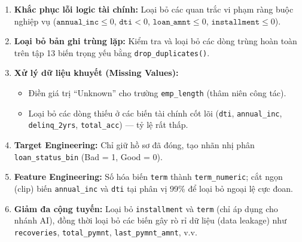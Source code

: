 \begin{enumerate}
    \item \textbf{Khắc phục lỗi logic tài chính:} Loại bỏ các quan trắc vi phạm ràng buộc nghiệp vụ ($\texttt{annual\_inc} \le 0$, $\texttt{dti} < 0$, $\texttt{loan\_amnt} \le 0$, $\texttt{installment} \le 0$).
    \item \textbf{Loại bỏ bản ghi trùng lặp:} Kiểm tra và loại bỏ các dòng trùng hoàn toàn trên tập 13 biến trọng yếu bằng \texttt{drop\_duplicates()}.
    \item \textbf{Xử lý dữ liệu khuyết (Missing Values):}
    \begin{itemize}
        \item Điền giá trị ``Unknown'' cho trường \texttt{emp\_length} (thâm niên công tác).
        \item Loại bỏ các dòng thiếu ở các biến tài chính cốt lõi (\texttt{dti}, \texttt{annual\_inc}, \texttt{delinq\_2yrs}, \texttt{total\_acc}) — tỷ lệ rất thấp.
    \end{itemize}
    \item \textbf{Target Engineering:} Chỉ giữ hồ sơ đã đóng, tạo nhãn nhị phân \texttt{loan\_status\_bin} (Bad = 1, Good = 0).
    \item \textbf{Feature Engineering:} Số hóa biến \texttt{term} thành \texttt{term\_numeric}; cắt ngọn (clip) biến \texttt{annual\_inc} và \texttt{dti} tại phân vị 99\% để loại bỏ ngoại lệ cực đoan.
    \item \textbf{Giảm đa cộng tuyến:} Loại bỏ \texttt{installment} và \texttt{term} (chỉ áp dụng cho nhánh AI), đồng thời loại bỏ các biến gây rò rỉ dữ liệu (data leakage) như \texttt{recoveries}, \texttt{total\_pymnt}, \texttt{last\_pymnt\_amnt}, v.v.
\end{enumerate}

